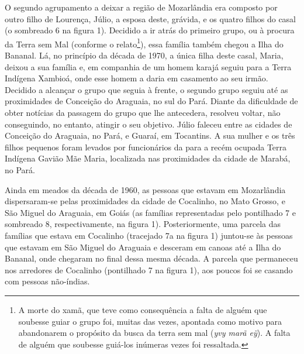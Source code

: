 {{O segundo agrupamento a deixar a região de Mozarlândia era composto por
outro filho de Lourença, Júlio, a esposa deste, grávida, e os quatro
filhos do casal (o sombreado 6 na figura 1). Decidido a ir atrás do
primeiro grupo, ou à procura da Terra sem Mal (conforme o
relato\footnote{A morte do xamã, que teve como consequência a falta de
alguém que soubesse guiar o grupo foi, muitas das vezes, apontada como
motivo para abandonarem o propósito da busca da terra sem mal (\emph{yvy marã
eÿ}). A falta de alguém que soubesse guiá-los inúmeras vezes foi
ressaltada.}), essa família também chegou a Ilha do Bananal. Lá, no
princípio da década de 1970, a única filha deste casal, Maria, deixou a
sua família e, em companhia de um homem karajá seguiu para a Terra
Indígena Xambioá, onde esse homem a daria em casamento ao seu irmão.
Decidido a alcançar o grupo que seguia à frente, o segundo grupo seguiu
até as proximidades de Conceição do Araguaia, no sul do Pará. Diante da
dificuldade de obter notícias da passagem do grupo que lhe antecedera,
resolveu voltar, não conseguindo, no entanto, atingir o seu objetivo.
Júlio faleceu entre as cidades de Conceição do Araguaia, no Pará, e
Guaraí, em Tocantins. A sua mulher e os três filhos pequenos foram
levados por funcionários da  para a recém ocupada Terra Indígena
Gavião Mãe Maria, localizada nas proximidades da cidade de Marabá, no
Pará. 

Ainda em meados da década de 1960, as pessoas que estavam em Mozarlândia
dispersaram-se pelas proximidades da cidade de Cocalinho, no Mato
Grosso, e São Miguel do Araguaia, em Goiás (as famílias representadas
pelo pontilhado 7 e sombreado 8, respectivamente, na figura 1).
Posteriormente, uma parcela das famílias que estava em Cocalinho
(tracejado 7a na figura 1) juntou-se às pessoas que estavam em São
Miguel do Araguaia e desceram em canoas até a Ilha do Bananal, onde
chegaram no final dessa mesma década. A parcela que permaneceu nos
arredores de Cocalinho (pontilhado 7 na figura 1), aos poucos foi se
casando com pessoas não-índias.  



}}

